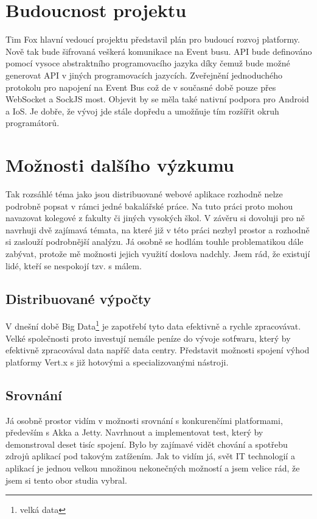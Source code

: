 \section{Budoucnost projektu}

Tim Fox hlavní vedoucí projektu představil plán\cite{plan} pro budoucí rozvoj platformy. Nově tak bude šifrovaná veškerá komunikace na Event busu. API bude definováno pomocí vysoce abstraktního programovacího jazyka díky čemuž bude možné generovat API v jiných programovacích jazycích. Zveřejnění jednoduchého protokolu pro napojení na Event Bus což de v současné době pouze přes WebSocket a SockJS most. Objevit by se měla také nativní podpora pro Android a IoS. Je dobře, že vývoj jde stále dopředu a umožňuje tím rozšířit okruh programátorů.

\section{Možnosti dalšího výzkumu}

Tak rozsáhlé téma jako jsou distribuované webové aplikace rozhodně nelze podrobně popsat v rámci jedné bakalářské práce. Na tuto práci proto mohou navazovat kolegové z fakulty či jiných vysokých škol. V závěru si dovoluji pro ně navrhuji dvě zajímavá témata, na které již v této práci nezbyl prostor a rozhodně si zaslouží podrobnější analýzu. Já osobně se hodlám touhle problematikou dále zabývat, protože mě možnosti jejich využití doslova nadchly. Jsem rád, že existují lidé, kteří se nespokojí tzv. s málem.
 
\subsection{Distribuované výpočty}

V dnešní době Big Data\footnote{velká data} je zapotřebí tyto data efektivně a rychle zpracovávat. Velké společnosti proto investují nemále peníze do vývoje sotfwaru, který by efektivně zpracovával data napříč data centry. Představit možnosti spojení výhod platformy Vert.x s již hotovými a specializovanými nástroji.

\subsection{Srovnání}

Já osobně prostor vidím v možnosti srovnání s konkurenčími platformami, především s Akka a Jetty. Navrhnout a implementovat test, který by demonstroval deset tisíc spojení. Bylo by zajímavé vidět chování a spotřebu zdrojů aplikací pod takovým zatížením. Jak to vidím já, svět IT technologií a aplikací je jednou velkou množinou nekonečných možností a jsem velice rád, že jsem si tento obor studia vybral.